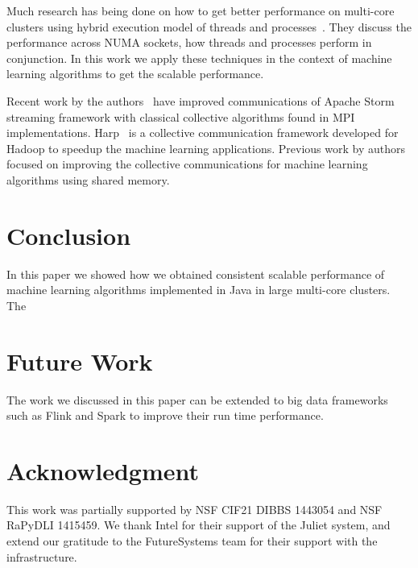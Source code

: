 \documentclass[10pt, conference, compsocconf]{IEEEtran}
\begin{document}
Much research has being done on how to get better performance on multi-core clusters using hybrid execution model of threads and processes~\cite{chorley2010performance, rabenseifner2009hybrid, camp2011streamline}. They discuss the performance across NUMA sockets, how threads and processes perform in conjunction. In this work we apply these techniques in the context of machine learning algorithms to get the scalable performance.

Recent work by the authors~\cite{kamburugamuve2016towards} have improved communications of Apache Storm streaming framework with classical collective algorithms found in MPI implementations. Harp~\cite{zhang2015harp} is a collective communication framework developed for Hadoop to speedup the machine learning applications. Previous work by authors~\cite{hpc2016:spidaljava} focused on improving the collective communications for machine learning algorithms using shared memory.

\section{Conclusion} \label{sec:conclusion}
In this paper we showed how we obtained consistent scalable performance of machine learning algorithms implemented in Java in large multi-core clusters. The 

\section{Future Work}
The work we discussed in this paper can be extended to big data frameworks such as Flink and Spark to improve their run time performance. 


\section*{Acknowledgment}
This work was partially supported by NSF CIF21 DIBBS 1443054 and NSF RaPyDLI 1415459. We thank Intel  for their support of the Juliet system, and extend our gratitude to the FutureSystems team for their support with the infrastructure. 

\end{document}
